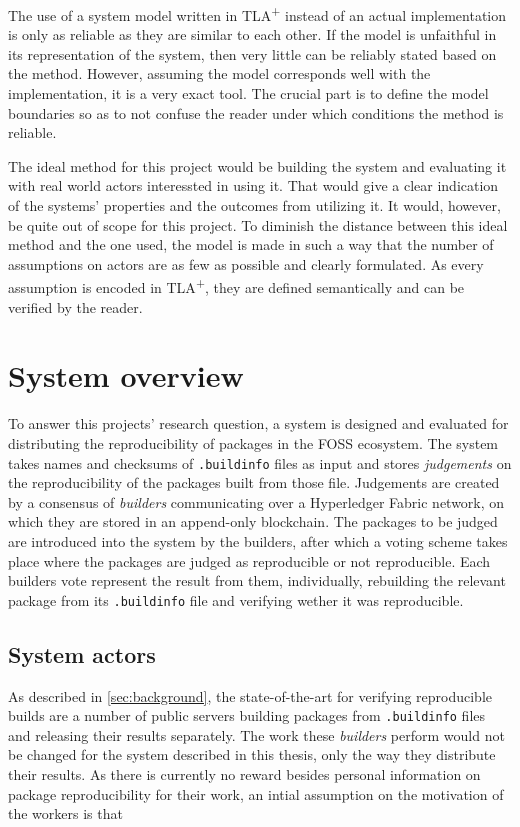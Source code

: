 The use of a system model written in TLA\textsuperscript+ instead of an actual implementation is only as reliable as they are similar to each other. If the model is unfaithful in its representation of the system, then very little can be reliably stated based on the method. However, assuming the model corresponds well with the implementation, it is a very exact tool. The crucial part is to define the model boundaries so as to not confuse the reader under which conditions the method is reliable.

The ideal method for this project would be building the system and evaluating it with real world actors interessted in using it. That would give a clear indication of the systems' properties and the outcomes from utilizing it. It would, however, be quite out of scope for this project. To diminish the distance between this ideal method and the one used, the model is made in such a way that the number of assumptions on actors are as few as possible and clearly formulated. As every assumption is encoded in TLA\textsuperscript+, they are defined semantically and can be verified by the reader.

\section{System overview}
\label{sec:systemOverview}

To answer this projects' research question, a system is designed and evaluated for distributing the reproducibility of packages in the \gls{FOSS} ecosystem. The system takes names and checksums of \texttt{.buildinfo} files as input and stores \textit{judgements} on the reproducibility of the packages built from those file. Judgements are created by a consensus of \textit{builders} communicating over a Hyperledger Fabric network, on which they are stored in an append-only blockchain. The packages to be judged are introduced into the system by the builders, after which a voting scheme takes place where the packages are judged as reproducible or not reproducible. Each builders vote represent the result from them, individually, rebuilding the relevant package from its \texttt{.buildinfo} file and verifying wether it was reproducible.

\subsection{System actors}
\label{sec:systemActors}

As described in \ref{sec:background}, the state-of-the-art for verifying reproducible builds are a number of public servers building packages from \texttt{.buildinfo} files and releasing their results separately. The work these \textit{builders} perform would not be changed for the system described in this thesis, only the way they distribute their results. As there is currently no reward besides personal information on package reproducibility for their work, an intial assumption on the motivation of the workers is that

